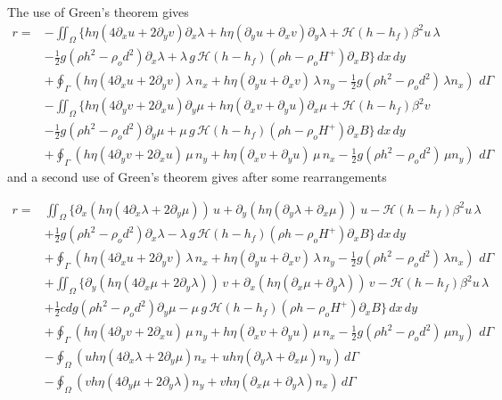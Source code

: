 \documentclass[10pt,a4paper]{book}
\newcommand{\He}{\mathcal{H}}
\newcommand{\p}{\partial}
\begin{document}
The use of Green's theorem gives
\begin{align} 
r=& -\iint_{\Omega} \big \{ h \eta ( 4 \p_x u + 2 \p_y v ) \p_x \lambda +  h \eta (\p_y u + \p_x v) \p_y \lambda + \He(h-h_f) \beta^2 u \, \lambda \nonumber \\
  &- \frac{1}{2} g (\rho h^2 - \rho_o d^2) \p_x \lambda   + \lambda \, g\,\He(h-h_f) (\rho h -\rho_o H^{+}) \p_x B \big \} \, dx \, dy \nonumber \\
  &+ \oint_{\Gamma} (h \eta ( 4\p_x u + 2 \p_y v) \, \lambda \, n_x+  h \eta (\p_y u + \p_x v) \, \lambda \, n_y- \frac{1}{2} g (\rho h^2 - \rho_o d^2) \, \lambda n_x)\, \, d\Gamma \nonumber \\
  &- \iint_{\Omega} \big \{ h \eta ( 4 \p_y v + 2 \p_x u ) \p_y \mu +  h \eta (\p_x v + \p_y u) \p_x \mu + \He(h-h_f) \beta^2 v \,  \nonumber \\
  &- \frac{1}{2} g (\rho h^2 - \rho_o d^2) \p_y \mu   + \mu \, g\,\He(h-h_f) (\rho h -\rho_o H^{+}) \p_x B \big \}  \, dx \, dy \nonumber \\
  &+ \oint_{\Gamma} (h \eta ( 4\p_y v + 2 \p_x u) \, \mu \, n_y+  h \eta (\p_x v + \p_y u) \, \mu \, n_x- \frac{1}{2} g (\rho h^2 - \rho_o d^2) \, \mu n_y)\, \, d\Gamma \nonumber
\end{align}
and a second use of Green's theorem gives after some rearrangements

\begin{align} 
r=& \iint_{\Omega} \big \{ \p_x ( h \eta ( 4 \p_x \lambda + 2 \p_y \mu ))  \, u +  \p_y ( h \eta (\p_y \lambda + \p_x \mu)) \, u - \He(h-h_f) \beta^2 u \, \lambda \nonumber \\
  &+ \frac{1}{2} g (\rho h^2 - \rho_o d^2) \p_x \lambda   - \lambda \, g\,\He(h-h_f) (\rho h -\rho_o H^{+}) \p_x B \big \}  \, dx \, dy \nonumber \\
  &+ \oint_{\Gamma} (h \eta ( 4\p_x u + 2 \p_y v) \, \lambda \, n_x+  h \eta (\p_y u + \p_x v) \, \lambda \, n_y- \frac{1}{2} g (\rho h^2 - \rho_o d^2) \, \lambda n_x)\,\, d\Gamma \nonumber \\
  &+\iint_{\Omega} \big \{  \p_y ( h \eta ( 4 \p_x \mu + 2 \p_y \lambda )) \, v +   \p_x ( h \eta (\p_x \mu + \p_y \lambda)) \, v - \He(h-h_f) \beta^2 u \, \lambda \nonumber \\
  &+ \frac{1}{2} cdg (\rho h^2 - \rho_o d^2) \p_y \mu   - \mu \, g\,\He(h-h_f) (\rho h -\rho_o H^{+}) \p_x B \big \} \, dx \, dy \nonumber \\
  &+ \oint_{\Gamma} (h \eta ( 4\p_y v + 2 \p_x u) \, \mu \, n_y +  h \eta (\p_x v + \p_y u) \, \mu \, n_x- \frac{1}{2} g (\rho h^2 - \rho_o d^2) \, \mu n_y )\, \, d\Gamma \nonumber \\
  &-\oint_{\Omega} (u h \eta ( 4 \p_x \lambda + 2 \p_y \mu )  n_x +  u  h \eta (\p_y \lambda + \p_x \mu) n_y )\,d\Gamma \nonumber \\
  &-\oint_{\Omega} (v h \eta ( 4 \p_y \mu + 2 \p_y \lambda )  n_y +  v  h \eta (\p_x \mu + \p_y \lambda)  n_x )\, d\Gamma \nonumber 
\end{align}
\end{document}
